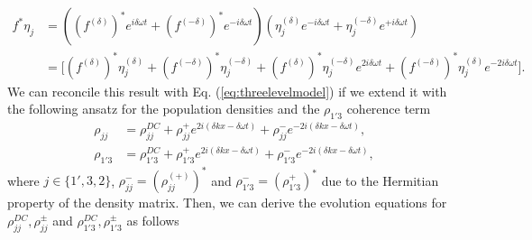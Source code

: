 \documentclass[]{spie}  %
\def\dw{\delta\omega}
\def\dk{\delta k}
\begin{document}
\begin{align}
\label{eq:feta-product}
f^{*}\eta_{j} &= ((f^{(\delta)})^*e^{  i\delta\omega t} + (f^{(-\delta)})^*e^{-i\delta\omega t})(\eta_{j}^{(\delta)}e^{ - i\delta\omega t} + \eta_{j}^{(-\delta)}e^{+i\delta\omega t}) \nonumber \\
&= \big[ (f^{(\delta)})^*\eta_{j}^{(\delta)} +(f^{(-\delta)})^*\eta_{j}^{(-\delta)} + (f^{(\delta)})^*\eta_{j}^{(-\delta)}e^{2i\delta\omega t} + (f^{(-\delta)})^*\eta_{j}^{(\delta)}e^{-2i\delta\omega t}\big ].
\end{align} 
We can reconcile this result with Eq. (\ref{eq:threelevelmodel}) if we extend it with the following ansatz for the  population densities and the $\rho_{1'3}$ coherence term 
\begin{align}
\rho_{jj} &= \rho_{jj}^{DC}+\rho_{jj}^{+}e^{2i(\dk x -\dw t)} + \rho_{jj}^{-}e^{-2i(\dk x -\dw t)}, \\
\rho_{1'3} &= \rho_{1'3}^{DC}+\rho_{1'3}^{+}e^{2i(\dk x -\dw t)} + \rho_{1'3}^{-}e^{-2i(\dk x -\dw t)},
\end{align}
where $j \in \{1',3,2\}$, $\rho_{jj}^{-} = (\rho_{jj}^{(+)})^*$ and $\rho_{1'3}^{-} = (\rho_{1'3}^{+})^*$ due to the Hermitian property of the density matrix. Then, we can derive the evolution equations for $\rho_{jj}^{DC},\rho_{jj}^{\pm}$ and $\rho_{1'3}^{DC},\rho_{1'3}^{\pm}$ as follows
\end{document}
